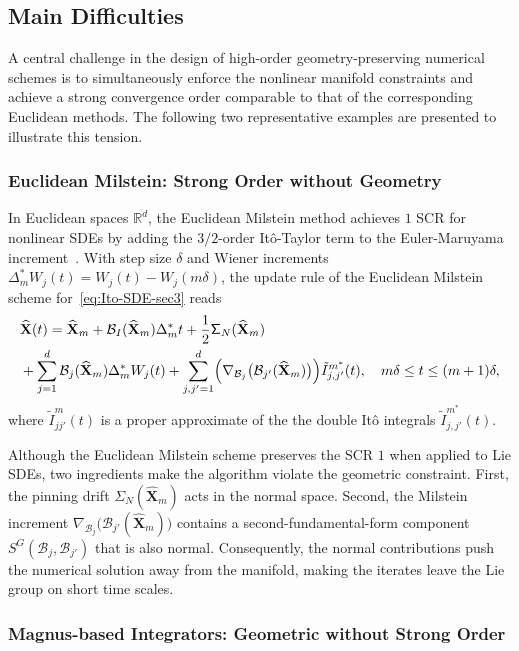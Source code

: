 \documentclass[11pt, a4paper, onecolumn]{article}
\newcommand{\m}{m}
\newcommand{\B}{\mathcal{B}}
\newcommand{\hatX}{\widehat{\bf X}}
\renewcommand{\bf}[1]{\mathbf{#1}}
\newcommand{\nm}[1]{\mathsf{#1}}
\newcommand{\ms}{{m^*}}
\newcommand{\Dms}{{\Delta^{*}_{m}}}
\newcommand{\tIjjpms}{ { \tilde I_{j,j'}^{\ms}} }
\newcommand{\half}{{\frac{1}{2}}}
\newcommand{\Der}[4]{
  #1_{#2}\bigl(#3(#4)\bigr)
}
\newcommand{\DerNjjp}[1]{\Der{\nabla}{\B_j}{\B_{j'}}{#1}}
\begin{document}
\subsection{Main Difficulties}
A central challenge in the design of high-order geometry-preserving numerical schemes is to simultaneously enforce the nonlinear manifold constraints and achieve a strong convergence order comparable to that of the corresponding Euclidean methods. The following two representative examples are presented to illustrate this tension.

\subsubsection{Euclidean Milstein: Strong Order without Geometry} In Euclidean spaces $\mathbb R^{d}$, the Euclidean Milstein method achieves $1$ SCR for nonlinear SDEs by adding the $3/2$-order It\^o-Taylor term to the Euler-Maruyama increment~\cite{mil1975approximate}. With step size $\delta$ and Wiener increments $\Dms W_j(t) = W_j(t) - W_{j}(m \delta)$, the update rule of the Euclidean Milstein scheme for~\cref{eq:Ito-SDE-sec3} reads
\begin{align*}
    &\hatX(t) =   \hatX_{\m} + \B_I(\hatX_{\m})\Dms t + \half \nm \Sigma_N(\hatX_m)\\ 
                &  + \sum_{j=1}^{d} \B_{j}(\hatX_{\m})\Dms W_{j}(t) + \sum_{j,j'=1}^d \Bigl(\DerNjjp{\hatX_m}\Bigr) \tIjjpms(t), \quad m\delta \le t \le (m+1)\delta,
\end{align*}
where $\tilde I_{jj'}^{m}(t)$ is a proper approximate of the the double It\^o integrals $\tIjjpms(t)$. 

Although the Euclidean Milstein scheme preserves the SCR $1$ when applied to Lie SDEs, two ingredients make the algorithm violate the geometric constraint. First, the pinning drift $\nm\Sigma_N(\hatX_m)$ acts in the normal space. Second, the Milstein increment $\DerNjjp{\hatX_m}$ contains a second-fundamental-form component $S^{G}(\B_{j},\B_{j'})$ that is also normal. Consequently, the normal contributions push the numerical solution away from the manifold, making the iterates leave the Lie group on short time scales.

\subsubsection{Magnus-based Integrators: Geometric without Strong Order}\label{sec:magnus_difficult}
\end{document}

